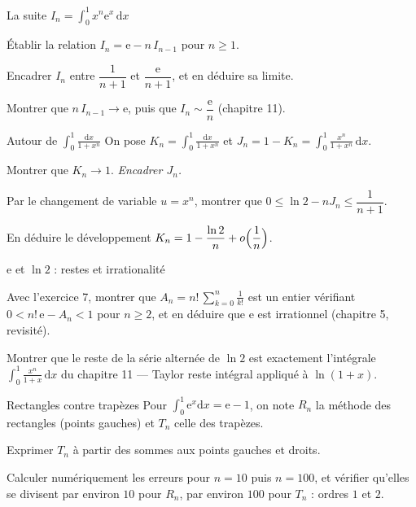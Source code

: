 \begin{exercice}[2]{La suite $I_n=\int_0^1 x^{n}\mathrm{e}^{x}\,\mathrm{d}x$}
\begin{questions}
  \item Établir la relation $I_n=\mathrm{e}-n\,I_{n-1}$ pour
    $n\geqslant1$.
  \item Encadrer $I_n$ entre $\dfrac{1}{n+1}$ et $\dfrac{\mathrm{e}}{n+1}$,
    et en déduire sa limite.
  \item Montrer que $n\,I_{n-1}\to\mathrm{e}$, puis que
    $I_n\sim\dfrac{\mathrm{e}}{n}$ (chapitre 11).
\end{questions}
\end{exercice}

\begin{exercice}[2]{Autour de $\int_0^1\frac{\mathrm{d}x}{1+x^{n}}$}
On pose $K_n=\displaystyle\int_{0}^{1}\frac{\mathrm{d}x}{1+x^{n}}$ et
$J_n=1-K_n=\displaystyle\int_{0}^{1}\frac{x^{n}}{1+x^{n}}\,\mathrm{d}x$.
\begin{questions}
  \item Montrer que $K_n\to1$. \emph{Encadrer $J_n$.}
  \item Par le changement de variable $u=x^{n}$, montrer que
    $0\leqslant\ln2-nJ_n\leqslant\dfrac{1}{n+1}$.
  \item En déduire le développement
    $K_n=1-\dfrac{\ln2}{n}+o\Bigl(\dfrac1n\Bigr)$.
\end{questions}
\end{exercice}

\begin{exercice}[2]{$\mathrm{e}$ et $\ln2$ : restes et irrationalité}
\begin{questions}
  \item Avec l'exercice 7, montrer que
    $A_n=n!\,\displaystyle\sum_{k=0}^{n}\frac{1}{k!}$ est un entier
    vérifiant $0<n!\,\mathrm{e}-A_n<1$ pour $n\geqslant2$, et en déduire
    que $\mathrm{e}$ est irrationnel (chapitre 5, revisité).
  \item Montrer que le reste de la série alternée de $\ln2$ est exactement
    l'intégrale $\displaystyle\int_{0}^{1}\frac{x^{n}}{1+x}\,\mathrm{d}x$
    du chapitre 11 — Taylor reste intégral appliqué à $\ln(1+x)$.
\end{questions}
\end{exercice}

\begin{exercice}[2]{Rectangles contre trapèzes}
Pour $\displaystyle\int_{0}^{1}\mathrm{e}^{x}\mathrm{d}x=\mathrm{e}-1$, on
note $R_n$ la méthode des rectangles (points gauches) et
$T_n$ celle des trapèzes.
\begin{questions}
  \item Exprimer $T_n$ à partir des sommes aux points gauches et droits.
  \item Calculer numériquement les erreurs pour $n=10$ puis $n=100$, et
    vérifier qu'elles se divisent par environ $10$ pour $R_n$, par environ
    $100$ pour $T_n$ : ordres $1$ et $2$.
\end{questions}
\end{exercice}

